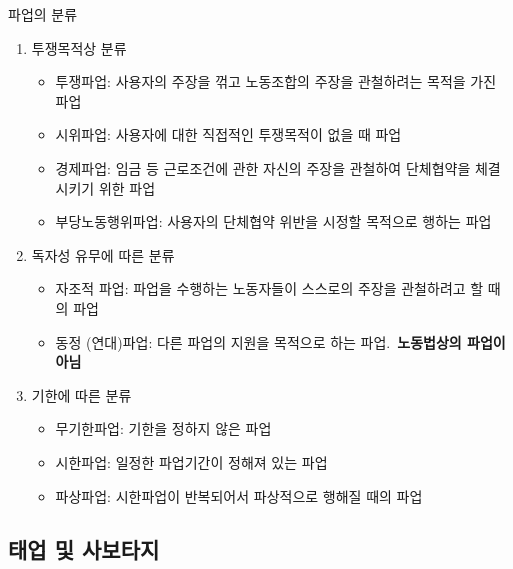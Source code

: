 \documentclass[aspectratio=169,xcolor=dvipsnames,handout]{beamer}
\begin{document}
\begin{frame}[allowframebreaks]{파업의 분류}
\begin{enumerate}[<+->]
\begin{itemize}[<+->]
        \end{itemize}
        \item 투쟁목적상 분류
        \begin{itemize}[<+->]
            \item 투쟁파업: 사용자의 주장을 꺾고 노동조합의 주장을 관철하려는 목적을 가진 파업
            \item 시위파업: 사용자에 대한 직접적인 투쟁목적이 없을 때 파업
            \item 경제파업: 임금 등 근로조건에 관한 자신의 주장을 관철하여 단체협약을 체결시키기 위한 파업
            \item 부당노동행위파업: 사용자의 단체협약 위반을 시정할 목적으로 행하는 파업 
        \end{itemize}
    \framebreak\relax
        \item 독자성 유무에 따른 분류
        \begin{itemize}[<+->]
            \item 자조적 파업: 파업을 수행하는 노동자들이 스스로의 주장을 관철하려고 할 때의 파업
            \item 동정 (연대)파업: 다른 파업의 지원을 목적으로 하는 파업.\ \textbf{노동법상의 파업이 아님}
        \end{itemize}
        \item 기한에 따른 분류
        \begin{itemize}[<+->]
            \item 무기한파업: 기한을 정하지 않은 파업
            \item 시한파업: 일정한 파업기간이 정해져 있는 파업
            \item 파상파업: 시한파업이 반복되어서 파상적으로 행해질 때의 파업
        \end{itemize}
    \end{enumerate}
\end{frame}

\subsection{태업 및 사보타지}
\end{document}
